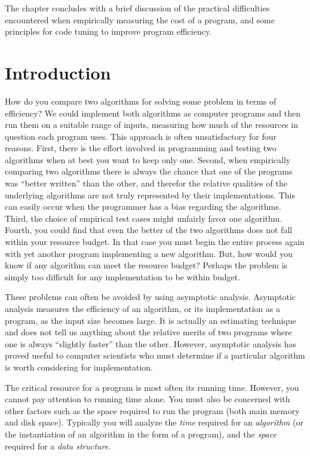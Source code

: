 \noindent The chapter concludes with a brief discussion of the practical
difficulties encountered when empirically
measuring the cost of a
program, and some principles for code tuning
to improve program efficiency.

\section{Introduction}
\label{AnalIntro}

How do you compare two algorithms for solving some problem in terms
of efficiency?
We could implement both algorithms as computer programs and then
run them on a suitable range of inputs, measuring how much of the
resources in question each program uses.
This approach is often unsatisfactory for four reasons.
First, there is the effort involved in programming and testing two
algorithms when at best you want to keep only one.
Second, when empirically comparing two algorithms there
is always the chance that one of the programs was ``better written''
than the other, and therefor the relative qualities of the underlying
algorithms are not truly represented by their implementations.
This can easily occur when the programmer has a bias
regarding the algorithms.
Third, the choice of empirical test cases might unfairly favor one
algorithm.
Fourth, you could find that even the better of the two algorithms does
not fall within your resource budget.
In that case you must begin the entire process again with yet another
program implementing a new algorithm.
But, how would you know if any algorithm can meet the resource budget?
Perhaps the problem is simply too difficult for any implementation to
be within budget.

These problems can often be avoided by using 
asymptotic analysis.
Asymptotic analysis measures the efficiency of an algorithm, or its
implementation as a program, as the input size becomes large.
It is actually an estimating technique
and does not tell us anything about the relative merits of two
programs where one is always ``slightly faster'' than the other.
However, asymptotic analysis has proved useful
to computer scientists who must determine if a particular algorithm
is worth considering for implementation.

The critical resource for a program is most often its running
time.
However, you cannot pay attention to running time alone.
You must also be concerned with other factors such as the space
required to run the program (both main memory and disk space).
Typically you will analyze the \emph{time} required for an
\emph{algorithm} (or the instantiation of an algorithm in the form
of a program), and the \emph{space} required for a
\emph{data structure}. 

